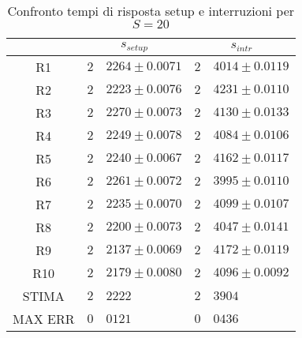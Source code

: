 \begin{table}[!h]
\begin{tabular}{c|r@{.}l|r@{.}l}
& \multicolumn{2}{|c|}{$s_{setup}$}
& \multicolumn{2}{|c}{$s_{intr}$}
\\          
\hline
R1      & $2$&$2264 \pm 0.0071$ & $2$&$4014 \pm 0.0119$ \\
R2      & $2$&$2223 \pm 0.0076$ & $2$&$4231 \pm 0.0110$ \\
R3      & $2$&$2270 \pm 0.0073$ & $2$&$4130 \pm 0.0133$ \\
R4      & $2$&$2249 \pm 0.0078$ & $2$&$4084 \pm 0.0106$ \\
R5      & $2$&$2240 \pm 0.0067$ & $2$&$4162 \pm 0.0117$ \\
R6      & $2$&$2261 \pm 0.0072$ & $2$&$3995 \pm 0.0110$ \\
R7      & $2$&$2235 \pm 0.0070$ & $2$&$4099 \pm 0.0107$ \\
R8      & $2$&$2200 \pm 0.0073$ & $2$&$4047 \pm 0.0141$ \\
R9      & $2$&$2137 \pm 0.0069$ & $2$&$4172 \pm 0.0119$ \\
R10     & $2$&$2179 \pm 0.0080$ & $2$&$4096 \pm 0.0092$ \\
STIMA   & $2$&$2222$            & $2$&$3904$            \\
MAX ERR & $0$&$0121$            & $0$&$0436$            
\end{tabular}
\centering
\caption{Confronto tempi di risposta setup e interruzioni per $S=20$}
\label{setintr_srv_20}
\end{table}
